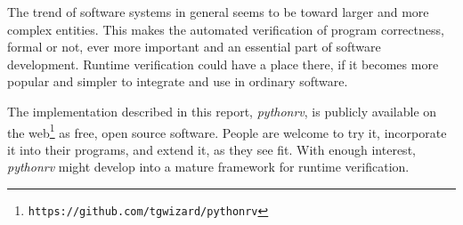 \documentclass[a4paper,11pt]{kth-mag}
\begin{document}
The trend of software systems in general seems to be toward larger and more
complex entities. This makes the automated verification of program
correctness, formal or not, ever more important and an essential part of
software development. Runtime verification could have a place there, if it
becomes more popular and simpler to integrate and use in ordinary software.

The implementation described in this report, \textit{pythonrv}, is publicly
available on the web\footnote{\texttt{https://github.com/tgwizard/pythonrv}} as
free, open source software. People are welcome to try it, incorporate it into
their programs, and extend it, as they see fit. With enough interest,
\textit{pythonrv} might develop into a mature framework for runtime
verification.












\end{document}
